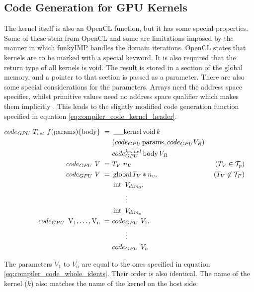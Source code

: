 \subsection{Code Generation for GPU Kernels}
\label{sect:compiler_gpu_code_kernel}
The kernel itself is also an OpenCL function, but it has some special properties. Some of these stem from OpenCL and some are limitations imposed by the manner in which funkyIMP handles the domain iterations. OpenCL states that kernels are to be marked with a special  keyword. It is also required that the return type of all kernels is void. The result is stored in a section of the global memory, and a pointer to that section is passed as a parameter. There are also some special considerations for the parameters. Arrays need the  address space specifier, whilst primitive values need no address space qualifier which makes them implicitly . This leads to the slightly modified code generation function specified in equation \ref{eq:compiler_code_kernel_header}.

\begin{align}
	\label{eq:compiler_code_kernel_header}
	code_{GPU}\ T_{ret}\ f(\operatorname{params})
		\{ \operatorname{body} \}\ = 	&\ \operatorname{\_\_kernel} \operatorname{void} k &\ \\
										&\ (code_{GPU} \operatorname{params}, code_{GPU} V_{R}) &\ \notag\\
										&\ code_{GPU}^{kernel} \operatorname{body} V_R &\ \notag\\
	code_{GPU}\ V\ = 					&\ T_{V}\ n_V &\ (T_V \in\mathcal{T}_p) \notag \\
	code_{GPU}\ V\ =					&\ \operatorname{global} T_V * n_v, &\ (T_V \not\in \mathcal{T}_P)&\ \notag \\
										&\	\operatorname{int}\ V_{dim_0},&\ \notag \\
										&\	\qquad\vdots&\ \notag \\
										&\	\operatorname{int}\ V_{dim_n}&\ \notag \\					
	code_{GPU}\ \operatorname{V_1,\dotsc, V_n}\ =&\ code_{GPU}\ V_1, &\ \notag\\
										&\ \qquad\vdots &\ \notag\\
										&\ code_{GPU}\ V_n &\ \notag
\end{align}

The parameters $V_1$ to $V_n$ are equal to the ones specified in equation \ref{eq:compiler_code_whole_idents}. Their order is also identical. The name of the kernel ($k$) also matches the name of the kernel on the host side.\\ 

